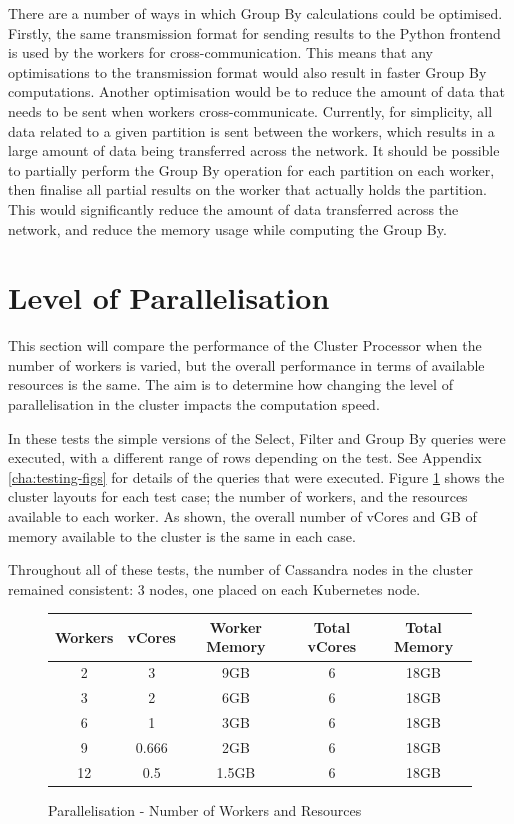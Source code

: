 There are a number of ways in which Group By calculations could be optimised. Firstly, the same transmission format for sending results to the Python frontend is used by the workers for cross-communication. This means that any optimisations to the transmission format would also result in faster Group By computations. Another optimisation would be to reduce the amount of data that needs to be sent when workers cross-communicate. Currently, for simplicity, all data related to a given partition is sent between the workers, which results in a large amount of data being transferred across the network. It should be possible to partially perform the Group By operation for each partition on each worker, then finalise all partial results on the worker that actually holds the partition. This would significantly reduce the amount of data transferred across the network, and reduce the memory usage while computing the Group By.

\section{Level of Parallelisation}
This section will compare the performance of the Cluster Processor when the number of workers is varied, but the overall performance in terms of available resources is the same. The aim is to determine how changing the level of parallelisation in the cluster impacts the computation speed. 

In these tests the simple versions of the Select, Filter and Group By queries were executed, with a different range of rows depending on the test. See Appendix \ref{cha:testing-figs} for details of the queries that were executed. Figure \ref{fig:parallelisation-test-workers} shows the cluster layouts for each test case; the number of workers, and the resources available to each worker. As shown, the overall number of vCores and GB of memory available to the cluster is the same in each case.

Throughout all of these tests, the number of Cassandra nodes in the cluster remained consistent: 3 nodes, one placed on each Kubernetes node.

\begin{figure}[h]
	\centering
	\begin{tabular}{| c | c | c | c | c |}
		\hline
		\textbf{Workers} & \textbf{vCores} & \textbf{Worker Memory} & \textbf{Total vCores} & \textbf{Total Memory} \\ \hline
		2 & 3 & 9GB & 6 & 18GB \\ \hline
		3 & 2 & 6GB & 6 & 18GB \\ \hline
		6 & 1 & 3GB & 6 & 18GB \\ \hline
		9 & 0.666 & 2GB & 6 & 18GB \\ \hline
		12 & 0.5 & 1.5GB & 6 & 18GB \\ \hline
	\end{tabular}
	\caption{Parallelisation - Number of Workers and Resources}
	\label{fig:parallelisation-test-workers}
\end{figure}


